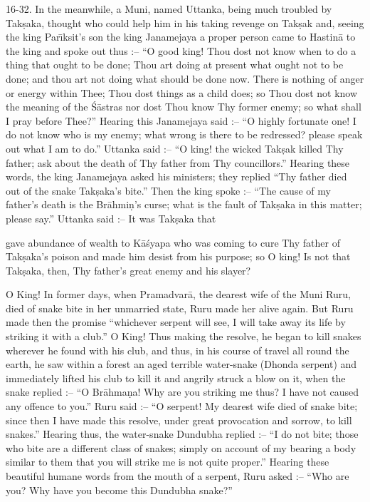 16-32. In the meanwhile, a Muni, named Uttanka, being much troubled by Tak\d{s}aka, thought who could help him in his taking revenge on Tak\d{s}ak and, seeing the king Par\={\i}ksit's son the king Janamejaya a proper person came to Hastin\=a to the king and spoke out thus :-- ``O good king! Thou dost not know when to do a thing that ought to be done; Thou art doing at present what ought not to be done; and thou art not doing what should be done now. There is nothing of anger or energy within Thee; Thou dost things as a child does; so Thou dost not know the meaning of the \'S\=astras nor dost Thou know Thy former enemy; so what shall I pray before Thee?'' Hearing this Janamejaya said :-- ``O highly fortunate one! I do not know who is my enemy; what wrong is there to be redressed? please speak out what I am to do.'' Uttanka said :-- ``O king! the wicked Tak\d{s}ak killed Thy father; ask about the death of Thy father from Thy councillors.'' Hearing these words, the king Janamejaya asked his ministers; they replied ``Thy father died out of the snake Tak\d{s}aka's bite.'' Then the king spoke :-- ``The cause of my father's death is the Br\=ahmi\d{n}'s curse; what is the fault of Tak\d{s}aka in this matter; please say.'' Uttanka said :-- It was Tak\d{s}aka that

gave abundance of wealth to K\=a\'syapa who was coming to cure Thy father of Tak\d{s}aka's poison and made him desist from his purpose; so O king! Is not that Tak\d{s}aka, then, Thy father's great enemy and his slayer?

O King! In former days, when Pramadvar\=a, the dearest wife of the Muni Ruru, died of snake bite in her unmarried state, Ruru made her alive again. But Ruru made then the promise ``whichever serpent will see, I will take away its life by striking it with a club.'' O King! Thus making the resolve, he began to kill snakes wherever he found with his club, and thus, in his course of travel all round the earth, he saw within a forest an aged terrible water-snake (Dhonda serpent) and immediately lifted his club to kill it and angrily struck a blow on it, when the snake replied :-- ``O Br\=ahma\d{n}a! Why are you striking me thus? I have not caused any offence to you.'' Ruru said :-- ``O serpent! My dearest wife died of snake bite; since then I have made this resolve, under great provocation and sorrow, to kill snakes.'' Hearing thus, the water-snake Dundubha replied :-- ``I do not bite; those who bite are a different class of snakes; simply on account of my bearing a body similar to them that you will strike me is not quite proper.'' Hearing these beautiful humane words from the mouth of a serpent, Ruru asked :-- ``Who are you? Why have you become this Dundubha snake?''

